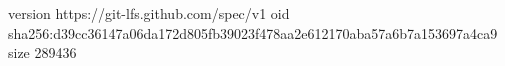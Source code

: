 version https://git-lfs.github.com/spec/v1
oid sha256:d39cc36147a06da172d805fb39023f478aa2e612170aba57a6b7a153697a4ca9
size 289436

